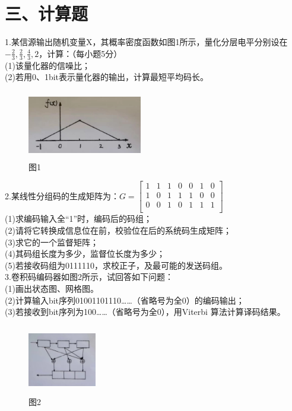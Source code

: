 \documentclass[UTF8]{ctexart}
\begin{document}
\section*{三、计算题}
1.某信源输出随机变量X，其概率密度函数如图1所示，量化分层电平分别设在$-\frac{2}{3},\frac{2}{3},
  \frac{4}{3},2$，计算：（每小题5分）\\
(1)该量化器的信噪比；\\
(2)若用0、1bit表示量化器的输出，计算最短平均码长。\\
\begin{figure}[H]
  \centering
  \includegraphics[width=5cm,height=3cm]{3_1.jpg}
  \caption*{图1}
\end{figure}
2.某线性分组码的生成矩阵为：$G=
  \begin{bmatrix}
    1 & 1 & 1 & 0 & 0 & 1 & 0 \\
    1 & 0 & 1 & 1 & 1 & 0 & 0 \\
    0 & 0 & 1 & 0 & 1 & 1 & 1 \\
  \end{bmatrix}$\\
(1)求编码输入全“1”时，编码后的码组；\\
(2)请将它转换成信息位在前，校验位在后的系统码生成矩阵；\\
(3)求它的一个监督矩阵；\\
(4)其码组长度为多少，监督位长度为多少；\\
(5)若接收码组为0111110，求校正子，及最可能的发送码组。\\
3.卷积码编码器如图2所示，试回答如下问题：\\
(1)画出状态图、网格图。\\
(2)计算输入bit序列01001101110……（省略号为全0）的编码输出；\\
(3)若接收到bit序列为100……（省略号为全0），用Viterbi
算法计算译码结果。\\
\begin{figure}[H]
  \centering
  \includegraphics[width=3cm,height=3cm]{3_3.jpg}
  \caption*{图2}
\end{figure}
\end{document}
